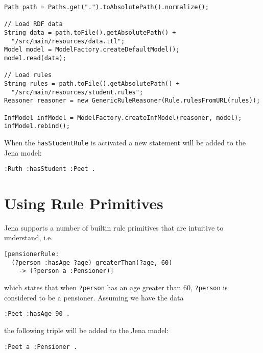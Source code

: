 \documentclass{amsart}
\begin{document}
\begin{small}
\begin{verbatim}
Path path = Paths.get(".").toAbsolutePath().normalize();

// Load RDF data
String data = path.toFile().getAbsolutePath() + 
  "/src/main/resources/data.ttl";
Model model = ModelFactory.createDefaultModel();
model.read(data);
    
// Load rules
String rules = path.toFile().getAbsolutePath() + 
  "/src/main/resources/student.rules";
Reasoner reasoner = new GenericRuleReasoner(Rule.rulesFromURL(rules));

InfModel infModel = ModelFactory.createInfModel(reasoner, model);   
infModel.rebind();    
\end{verbatim}
\end{small}
When the \texttt{hasStudentRule} is activated a new statement will be added to the Jena model:
\begin{small}
\begin{verbatim}
:Ruth :hasStudent :Peet .
\end{verbatim}
\end{small}

\section{Using Rule Primitives}
Jena supports a number of builtin rule primitives that are intuitive to understand, i.e. 
\begin{small}
\begin{verbatim}
[pensionerRule: 
  (?person :hasAge ?age) greaterThan(?age, 60) 
    -> (?person a :Pensioner)]
\end{verbatim}
\end{small}
which states that when \texttt{?person} has an age greater than 60, \texttt{?person} is considered to be a pensioner. Assuming we have the data 

\begin{small}
\begin{verbatim}
:Peet :hasAge 90 .
\end{verbatim}
\end{small}

the following triple will be added to the Jena model:
\begin{small}
\begin{verbatim}
:Peet a :Pensioner .
\end{verbatim}
\end{small}
\end{document}
